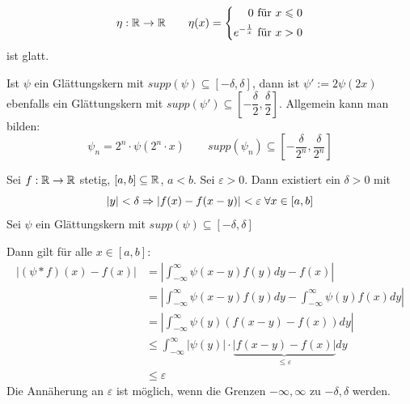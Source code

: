 \documentclass[main.tex]{subfiles}
\begin{document}
\begin{Beispiel}
  $$\eta: \mathbb{R} \to \mathbb{R} \qquad \eta(x) = \left\{\begin{aligned} 0 & \text{ für } x \leqslant 0 \\ e^{-\frac{1}{x}} & \text{ für } x > 0\end{aligned}\right.$$
  ist glatt.
  \begin{center}
  \end{center}
\end{Beispiel}

\begin{Bemerkung}[Warnung]
  Ist $\psi$ ein Glättungskern mit $supp(\psi) \subseteq [-\delta,\delta]$, dann ist $\psi' :=2 \psi(2x)$ ebenfalls ein Glättungskern mit $supp(\psi') \subseteq \left[-\dfrac{\delta}{2},\dfrac{\delta}{2}\right]$. Allgemein kann man bilden:
  $$\psi_n = 2^n \cdot \psi(2^n \cdot x) \qquad supp(\psi_n) \subseteq \left[-\dfrac{\delta}{2^n},\dfrac{\delta}{2^n}\right]$$
\end{Bemerkung}

Sei $f: \mathbb{R} \to \mathbb{R}$ stetig, $[a,b] \subseteq \mathbb{R}$, $a < b$. Sei $\varepsilon > 0$. Dann existiert ein $\delta > 0 $ mit
$$|y| < \delta \Rightarrow |f(x) - f(x-y)| < \varepsilon \;\forall x\in [a,b]$$
Sei $\psi$ ein Glättungskern mit $supp(\psi) \subseteq [-\delta,\delta]$

Dann gilt für alle $x \in [a,b]$:
$$\begin{aligned}
  |(\psi * f)(x) - f(x)| & = \left|\int_{-\infty}^\infty \psi(x-y)f(y)dy - f(x)\right| \\
  & = \left|\int_{-\infty}^\infty \psi(x-y)f(y)dy - \int_{-\infty}^\infty \psi(y) f(x)dy \right| \\
  & = \left|\int_{-\infty}^\infty \psi(y)(f(x-y) - f(x)) dy \right| \\
  & \leq \int_{-\infty}^\infty |\psi(y)| \cdot \underbrace{|f(x-y) - f(x)|}_{\leq \varepsilon} dy \\
  & \leq \varepsilon
\end{aligned}$$
Die Annäherung an $\varepsilon$ ist möglich, wenn die Grenzen $-\infty ,  \infty$ zu $-\delta,\delta$ werden.
\end{document}
